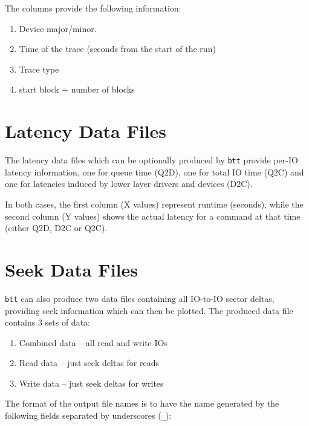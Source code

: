 \documentclass{article}
\begin{document}
  The columns provide the following information:

  \begin{enumerate}
    \item Device major/minor.

    \item Time of the trace (seconds from the start of the run)

    \item Trace type

    \item start block + number of blocks
  \end{enumerate}
 
\newpage\section{\label{sec:lat}\label{sec:lat-q2d}\label{sec:lat-q2c}\label{sec:lat-d2c}Latency Data Files}

  The latency data files which can be optionally produced by \texttt{btt}
  provide per-IO latency information, one for queue time (Q2D), one
  for total IO time (Q2C) and one for latencies induced by lower layer
  drivers and devices (D2C).

  In both cases, the first column (X values) represent runtime (seconds),
  while the second column (Y values) shows the actual latency for a
  command at that time (either Q2D, D2C or Q2C).

\newpage\section{\label{sec:seek}Seek Data Files}

  \texttt{btt} can also produce two data files containing all IO-to-IO sector
  deltas, providing seek information which can then be plotted. The
  produced data file contains 3 sets of data:

  \begin{enumerate}
     \item Combined data -- all read and write IOs

     \item Read data -- just seek deltas for reads

     \item Write data -- just seek deltas for writes
  \end{enumerate}

  The format of the output file names is to have the name generated by
  the following fields separated by underscores (\texttt{\_}):
 
\end{document}
